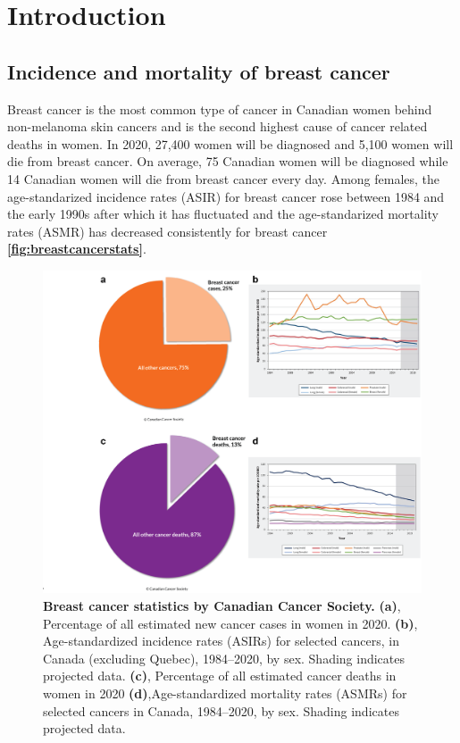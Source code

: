 
\chapter{Introduction}
\label{ch:Introduction}

\section{Incidence and mortality of breast cancer}
Breast cancer is the most common type of cancer in Canadian women behind non-melanoma skin cancers and is the second highest cause of cancer related deaths in women. In 2020, 27,400 women will be diagnosed and 5,100 women will die from breast cancer. On average, 75 Canadian women will be diagnosed while 14 Canadian women will die from breast cancer every day. Among females, the age-standarized incidence rates (ASIR) for breast cancer rose between 1984 and the early 1990s after which it has fluctuated and the age-standarized mortality rates (ASMR) has decreased consistently for breast cancer \cite{canadian2020canadian} \textbf{\autoref{fig:breastcancerstats}}.

\begin{figure}
\centering
\includegraphics[width=\textwidth]{Figures/breastcancerstats.png}
	\caption[Breast cancer statistics by Canadian cancer society ]
	{\small
	    \textbf{Breast cancer statistics by Canadian Cancer Society.}
	    \textbf{(a)}, Percentage of all estimated new cancer cases in women in 2020.
	    \textbf{(b)}, Age-standardized incidence rates (ASIRs) for selected cancers, in Canada (excluding Quebec), 1984–2020, by sex. Shading indicates projected data.
	    \textbf{(c)}, Percentage of all estimated cancer deaths in women in 2020
	     \textbf{(d)},Age-standardized mortality rates (ASMRs) for selected cancers in Canada, 1984–2020, by sex. Shading indicates projected data.
	}
	\label{fig:breastcancerstats}
\end{figure}

